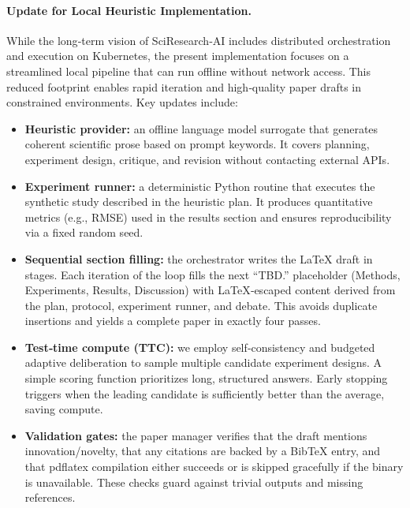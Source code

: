\paragraph{Update for Local Heuristic Implementation.}  While the long‑term vision of SciResearch‑AI includes distributed orchestration and execution on Kubernetes, the present implementation focuses on a streamlined local pipeline that can run offline without network access.  This reduced footprint enables rapid iteration and high‑quality paper drafts in constrained environments.  Key updates include:
\begin{itemize}[leftmargin=1.4em]
  \item \textbf{Heuristic provider:} an offline language model surrogate that generates coherent scientific prose based on prompt keywords.  It covers planning, experiment design, critique, and revision without contacting external APIs.
  \item \textbf{Experiment runner:} a deterministic Python routine that executes the synthetic study described in the heuristic plan.  It produces quantitative metrics (e.g., RMSE) used in the results section and ensures reproducibility via a fixed random seed.
  \item \textbf{Sequential section filling:} the orchestrator writes the LaTeX draft in stages.  Each iteration of the loop fills the next “TBD.” placeholder (Methods, Experiments, Results, Discussion) with LaTeX‑escaped content derived from the plan, protocol, experiment runner, and debate.  This avoids duplicate insertions and yields a complete paper in exactly four passes.
  \item \textbf{Test‑time compute (TTC):} we employ self‑consistency and budgeted adaptive deliberation \cite{wang2022selfconsistency} to sample multiple candidate experiment designs.  A simple scoring function prioritizes long, structured answers.  Early stopping triggers when the leading candidate is sufficiently better than the average, saving compute.
  \item \textbf{Validation gates:} the paper manager verifies that the draft mentions innovation/novelty, that any citations are backed by a BibTeX entry, and that pdflatex compilation either succeeds or is skipped gracefully if the binary is unavailable.  These checks guard against trivial outputs and missing references.
\end{itemize}

